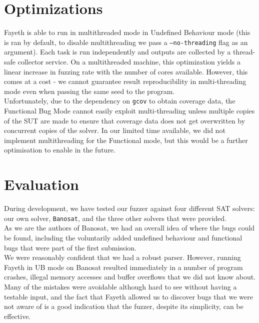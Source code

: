\documentclass{article}
\begin{document}
\section{Optimizations}

Fayeth is able to run in multithreaded mode in Undefined Behaviour mode (this is ran by default, to disable multithreading we pass a \texttt{--no-threading} flag as an argument). Each task is run independently
and outputs are collected by a thread-safe collector service. On a multithreaded machine, this optimization
yields a linear increase in fuzzing rate with the number of cores available. However, this comes at a cost - we cannot guarantee result reproducibility in multi-threading mode even when passing the same seed to the program.\\

Unfortunately, due to the dependency on \verb|gcov| to obtain coverage data, the Functional Bug Mode cannot
easily exploit multi-threading unless multiple copies of the SUT are made to ensure that coverage data does
not get overwritten by concurrent copies of the solver. In our limited time available, we did not implement
multithreading for the Functional mode, but this would be a further optimisation to enable in the future.

\section{Evaluation}

During development, we have tested our fuzzer against four different SAT solvers: our own solver, \verb|Banosat|, and
the three other solvers that were provided.  \\

As we are the authors of Banosat, we had an overall idea of where the bugs could be found, 
including the voluntarily added undefined behaviour and functional bugs that were part of the first submission.\\

We were reasonably confident that we had a robust parser. However, running Fayeth in UB mode on
Banosat resulted immediately in a number of program crashes, illegal memory accesses and buffer overflows
that we did not know about. Many of the mistakes were avoidable although hard to see without having
a testable input, and the fact that Fayeth allowed us to discover bugs that we were not aware of is
a good indication that the fuzzer, despite its simplicity, can be effective. \\
\end{document}
